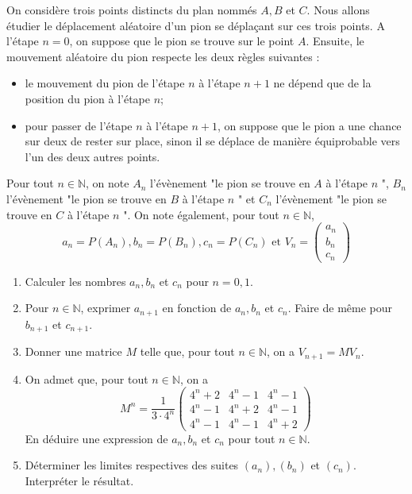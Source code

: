 \begin{exercice}

On considère trois points distincts du plan nommés $A, B$ et $C$. Nous allons étudier le déplacement aléatoire d'un pion se déplaçant sur ces trois points. A l'étape $n=0$, on suppose que le pion se trouve sur le point $A$. Ensuite, le mouvement aléatoire du pion respecte les deux règles suivantes :
\begin{itemize}
\item  le mouvement du pion de l'étape $n$ à l'étape $n+1$ ne dépend que de la position du pion à l'étape $n$;
\item pour passer de l'étape $n$ à l'étape $n+1$, on suppose que le pion a une chance sur deux de rester sur place, sinon il se déplace de manière équiprobable vers l'un des deux autres points.

\end{itemize}

Pour tout $n \in \mathbb{N}$, on note $A_{n}$ l'évènement "le pion se trouve en $A$ à l'étape $n$ ", $B_{n}$ l'évènement "le pion se trouve en $B$ à l'étape $n$ " et $C_{n}$ l'évènement "le pion se trouve en $C$ à l'étape $n$ ". On note également, pour tout $n \in \mathbb{N}$,
$$
a_{n}=P\left(A_{n}\right), b_{n}=P\left(B_{n}\right), c_{n}=P\left(C_{n}\right) \text { et } V_{n}=\left(\begin{array}{l}
a_{n} \\
b_{n} \\
c_{n}
\end{array}\right)
$$
\begin{enumerate}
\item  Calculer les nombres $a_{n}, b_{n}$ et $c_{n}$ pour $n=0,1$.
\item  Pour $n \in \mathbb{N}$, exprimer $a_{n+1}$ en fonction de $a_{n}, b_{n}$ et $c_{n} .$ Faire de même pour $b_{n+1}$ et $c_{n+1}$.
\item  Donner une matrice $M$ telle que, pour tout $n \in \mathbb{N}$, on a $V_{n+1}=M V_{n}$.
\item  On admet que, pour tout $n \in \mathbb{N}$, on a
$$
M^{n}=\frac{1}{3 \cdot 4^{n}}\left(\begin{array}{ccc}
4^{n}+2 & 4^{n}-1 & 4^{n}-1 \\
4^{n}-1 & 4^{n}+2 & 4^{n}-1 \\
4^{n}-1 & 4^{n}-1 & 4^{n}+2
\end{array}\right)
$$
En déduire une expression de $a_{n}, b_{n}$ et $c_{n}$ pour tout $n \in \mathbb{N}$.
\item  Déterminer les limites respectives des suites $\left(a_{n}\right),\left(b_{n}\right)$ et $\left(c_{n}\right)$. Interpréter le résultat.
\end{enumerate}


\end{exercice}



